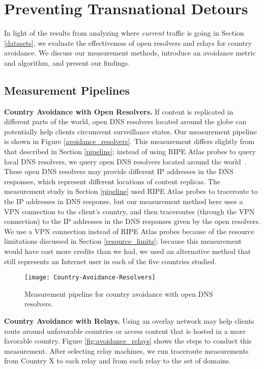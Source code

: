 \section{Preventing Transnational Detours}
\label{avoid_results}
In light of the results from analyzing where \textit{current} traffic is going in Section \ref{datasets}, we evaluate the effectiveness of open resolvers and relays for country avoidance.  We discuss our measurement methods, introduce an avoidance metric and algorithm, and present our findings.

\subsection{Measurement Pipelines}

{\bf Country Avoidance with Open Resolvers.} If content is replicated in different parts of the world, open DNS resolvers located around the globe can potentially help clients circumvent surveillance states.  Our measurement pipeline is shown in Figure \ref{avoidance_resolvers}.  This measurement differs slightly from that described in Section \ref{pipeline}; instead of using RIPE Atlas probes to query local DNS resolvers, we query open DNS resolvers located around the world~\cite{open_resolver_list}.  These open DNS resolvers may provide different IP addresses in the DNS responses, which represent different locations of content replicas. The measurement study in Section \ref{pipeline} used RIPE Atlas probes to traceroute to the IP addresses in DNS response, but our measurement method here uses a VPN connection to the client's country, and then traceroutes (through the VPN connection) to the IP addresses in the DNS responses given by the open resolvers.  We use a VPN connection instead of RIPE Atlas probes because of the resource limitations discussed in Section \ref{resource_limits}; because this measurement would have cost more credits than we had, we used an alternative method that still represents an Internet user in each of the five countries studied.

\begin{figure}
\centering
\texttt{[image: Country-Avoidance-Resolvers]}
\caption{Measurement pipeline for country avoidance with open DNS resolvers.}
\label{fig:avoidance_resolvers}
\end{figure}

{\bf Country Avoidance with Relays.} Using an overlay network may help clients route around unfavorable countries or access content that is hosted in a more favorable country.  Figure \ref{fig:avoidance_relays} shows the steps to conduct this measurement.  After selecting relay machines, we run traceroute measurements from Country X to each relay and from each relay to the set of domains. 

